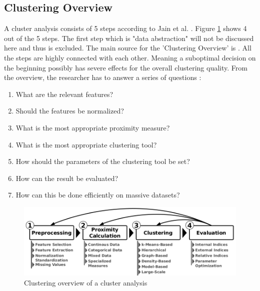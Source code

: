 \documentclass[a4paper,10pt]{article}
\theoremstyle{plain}
\theoremstyle{definition}
\begin{document}
 \subsection{Clustering Overview}

A cluster analysis consists of 5 steps according to Jain et al. \cite{19overview}. Figure \ref{fig:clusterAnalysis} shows 4 out of the 5 steps. The first step which is "data abstraction" will not be discussed here and thus is excluded. The main source for the 'Clustering Overview' is \cite{clusteringOverview}. All the steps are highly connected with each other. Meaning a suboptimal decision on the beginning possibly has severe effects for the overall clustering quality. From the overview, the researcher has to answer a series of questions \cite{clusteringOverview}:
\begin{enumerate}
	\item What are the relevant features?
	\item Should the features be normalized?
	\item What is the most appropriate proximity measure?
	\item What is the most appropriate clustering tool?
	\item How should the parameters of the clustering tool be set?
	\item How can the result be evaluated?
	\item How can this be done efficiently on massive datasets?
\end{enumerate}
\begin{figure}
	\centering
	\includegraphics[scale=0.4]{./pictures/clusterAnalysis.png}
	\caption{Clustering overview of a cluster analysis \cite{clusterAnalysis}}
	\label{fig:clusterAnalysis}
\end{figure}

\end{document}
